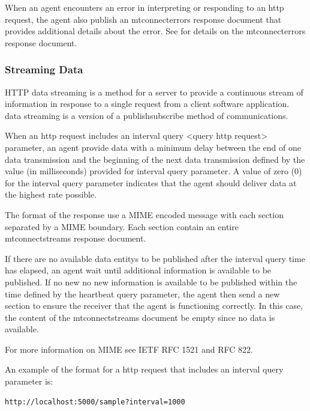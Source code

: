 When an \gls{agent} encounters an error in interpreting or responding to an \gls{http request}, the \gls{agent} \MUST also publish an \gls{mtconnecterrors response document} that provides additional details about the error.  See  for details on the \gls{mtconnecterrors response document}.  

\subsubsection{Streaming Data}
\label{sec:Streaming Data}

HTTP \gls{data streaming} is a method for a server to provide a continuous stream of information in response to a single \gls{request} from a client software application.  \gls{data streaming} is a version of a \gls{publishsubscribe} method of communications.

When an \gls{http request} includes an \gls{interval query} <\gls{query http request}> parameter, an \gls{agent} \MUST provide data with a minimum delay between the end of one data transmission and the beginning of the next data transmission defined by the value (in milliseconds) provided for \gls{interval query} parameter.  A value of zero (0) for the \gls{interval query} parameter indicates that the \gls{agent} should deliver data at the highest rate possible.

The format of the response \MUST use a MIME encoded message with each section separated by a MIME boundary.  Each section \MUST contain an entire \gls{mtconnectstreams response document}. 

If there are no available \glspl{data entity} to be published after the \gls{interval query} time has elapsed, an \gls{agent} \MUST wait until additional information is available to be published.  If no new no new information is available to be published within the time defined by the \gls{heartbeat query} parameter, the \gls{agent} \MUST then send a new section to ensure the receiver that the \gls{agent} is functioning correctly.  In this case, the content of the \gls{mtconnectstreams} document \MUST be empty since no data is available.

For more information on MIME see IETF RFC 1521 and RFC 822.  

An example of the format for a \gls{http request} that  includes an \gls{interval query} parameter is:
\begin{lstlisting}[firstnumber=1,escapechar=|,%
    caption={Example for HTTP Request with interval parameter},label={lst:example-for-http-request-with-interval-parameter}]
http://localhost:5000/sample?interval=1000
\end{lstlisting}

